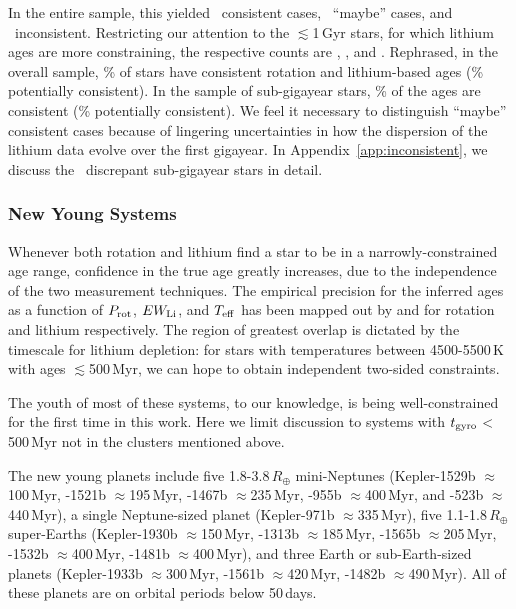 \documentclass[11pt,twocolumn,tighten]{aastex63}
\begin{document}
In the entire sample, this yielded \allagesyesconsistent\ consistent
cases, \allagesmaybeconsistent\ ``maybe'' cases, and
\allagesnoconsistent\ inconsistent.  Restricting our attention to the
$\lesssim$1\,Gyr stars, for which lithium ages are more constraining,
the respective counts are \minageltonegyryesconsistent,
\minageltonegyrmaybeconsistent, and \minageltonegyrnoconsistent.
Rephrased, in the overall sample, \fracconsistentallages\% of stars
have consistent rotation and lithium-based ages
(\fracpotentiallyconsistentallages\% potentially consistent).  In the
sample of sub-gigayear stars, \fracconsistentminageltonegyr\% of the
ages are consistent (\fracpotentiallyconsistentminageltonegyr\%
potentially consistent).  We feel it necessary to distinguish
``maybe'' consistent cases because of lingering uncertainties in how
the dispersion of the lithium data evolve over the first gigayear.  In
Appendix~\ref{app:inconsistent}, we discuss the
\minageltonegyrnoconsistent\ discrepant sub-gigayear stars in detail.


\subsubsection{New Young Systems}
%
Whenever both rotation and lithium find a star to be in a
narrowly-constrained age range, confidence in the true age greatly
increases, due to the independence of the two measurement techniques.
The empirical precision for the inferred ages as a function of $P_{\rm
rot}$, $EW_{\rm Li}$, and $T_{\rm eff}$ has been mapped out by
\citet{Bouma_2023} and \citet{Jeffries_2023} for rotation and lithium
respectively.  The region of greatest overlap is dictated by the
timescale for lithium depletion: for stars with temperatures between
4500-5500\,K with ages $\lesssim$500\,Myr, we can hope to obtain
independent two-sided constraints.

The youth of most of these systems, to our knowledge, is being
well-constrained for the first time in this work.  Here we limit
discussion to systems with $t_{\rm gyro}$$<$500\,Myr not in the clusters
mentioned above.

The new young planets
include five 1.8-3.8\,$R_\oplus$ mini-Neptunes
(Kepler-1529b $\approx$100\,Myr,
-1521b $\approx$195\,Myr,
-1467b $\approx$235\,Myr,
-955b $\approx$400\,Myr, and
-523b $\approx$440\,Myr),
a single Neptune-sized planet
(Kepler-971b $\approx$335\,Myr),
five 1.1-1.8\,$R_\oplus$ super-Earths
(Kepler-1930b $\approx$150\,Myr,
-1313b $\approx$185\,Myr,
-1565b $\approx$205\,Myr,
-1532b $\approx$400\,Myr,
-1481b $\approx$400\,Myr),
and three Earth or sub-Earth-sized planets
(Kepler-1933b $\approx$300\,Myr,
-1561b $\approx$420\,Myr,
-1482b $\approx$490\,Myr).
All of these planets are on orbital periods below 50\,days.
\end{document}
